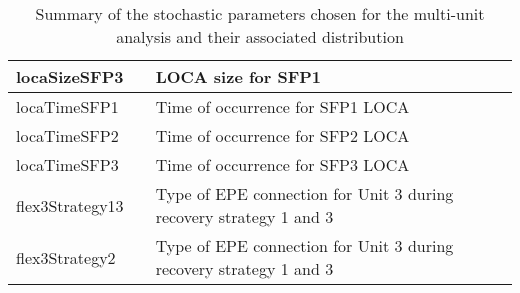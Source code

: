\begin{table}
\begin{center}
\begin{tabular}{ | l | p{5cm} | p{5cm} |}
         locaSizeSFP3       &              & LOCA size for SFP1               \\ \hline    
         locaTimeSFP1       &              & Time of occurrence for SFP1 LOCA \\ \hline
         locaTimeSFP2       &              & Time of occurrence for SFP2 LOCA \\ \hline
         locaTimeSFP3       &              & Time of occurrence for SFP3 LOCA \\ \hline
         flex3Strategy13    &              & Type of EPE connection for Unit 3 during recovery strategy 1 and 3  \\ \hline
         flex3Strategy2     &              & Type of EPE connection for Unit 3 during recovery strategy 1 and 3  \\ 
        \hline
      \end{tabular}
  \end{center}
  \caption{Summary of the stochastic parameters chosen for the multi-unit analysis and their associated distribution}
  \label{tab:stochasticParameters}
\end{table}


